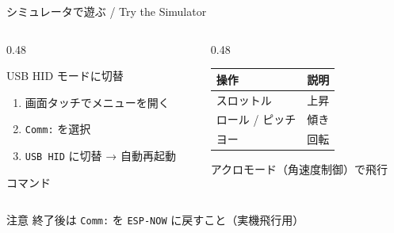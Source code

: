 \begin{frame}{シミュレータで遊ぶ / Try the Simulator}
  \begin{columns}[T]
    \begin{column}{0.48\textwidth}
      \begin{block}{USB HID モードに切替}\footnotesize
        \begin{enumerate}\setlength{\itemsep}{0pt}
          \item 画面タッチでメニューを開く
          \item \texttt{Comm:} を選択
          \item \texttt{USB HID} に切替 → 自動再起動
        \end{enumerate}
      \end{block}
      \vspace{0.2em}
      \begin{block}{コマンド}\footnotesize
        \\
      \end{block}
    \end{column}
    \begin{column}{0.48\textwidth}
      \footnotesize
      \begin{table}
        \centering\footnotesize
        \begin{tabular}{ll}
          \hline
          \textbf{操作} & \textbf{説明} \\
          \hline
          スロットル       & 上昇 \\
          ロール / ピッチ  & 傾き \\
          ヨー             & 回転 \\
          \hline
        \end{tabular}
      \end{table}
      \vspace{-0.5em}
      アクロモード（角速度制御）で飛行
    \end{column}
  \end{columns}

  \begin{alertblock}{注意}\footnotesize
    終了後は \texttt{Comm:} を \texttt{ESP-NOW} に戻すこと（実機飛行用）
  \end{alertblock}
\end{frame}

